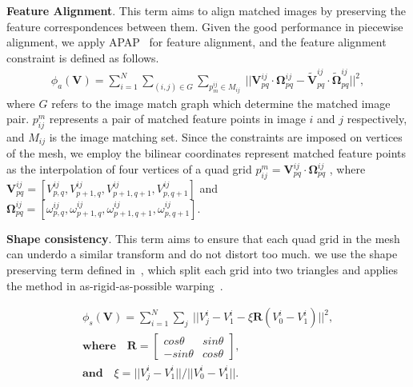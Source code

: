 \documentclass[10pt,journal,compsoc]{IEEEtran}
\begin{document}
\textbf{Feature Alignment}.
This term aims to align matched images by preserving the feature correspondences between them.
Given the good performance in piecewise alignment, we apply APAP~\cite{journals/pami/ZaragozaCTBS14} for feature alignment, and the feature alignment constraint is defined as follows.
\begin{equation} \label{equ:feature_align}
\begin{split}
    \phi_a(\mathbf{V}) = \sum\limits_{i=1}^N\sum\limits_{(i, j)\in G}\sum\limits_{p^{ij}_m \in M_{ij}} \
    ||\mathbf{V}^{ij}_{pq} \cdot  \mathbf{\Omega}^{ij}_{pq} - \mathbf{\widetilde{V}}^{ij}_{pq} \cdot  \mathbf{\widetilde{\Omega}}^{ij}_{pq}||^2,
\end{split}
\end{equation}
where $G$ refers to the image match graph which determine the matched image pair.
$p_{ij}^m$ represents a pair of matched feature points in image $i$ and $j$ respectively, and $M_{ij}$ is the image matching set.
Since the constraints are imposed on vertices of the mesh, we employ the bilinear coordinates represent matched feature points as the interpolation of four vertices of a quad grid
$p_{ij}^m=\mathbf{V}^{ij}_{pq} \cdot  \mathbf{\Omega}^{ij}_{pq}$ , where $\mathbf{V}^{ij}_{pq}=[V^{ij}_{p,q},V^{ij}_{p+1,q},V^{ij}_{p+1,q+1},V^{ij}_{p,q+1}]$ and $\mathbf{\Omega}^{ij}_{pq}=[\omega^{ij}_{p,q},\omega^{ij}_{p+1,q},\omega^{ij}_{p+1,q+1},\omega^{ij}_{p,q+1}]$.

\textbf{Shape consistency}.
This term aims to ensure that each quad grid in the mesh can underdo a similar transform and do not distort too much.
we use the shape preserving term defined in~\cite{journals/tog/LiuYT013}, which split each grid into two triangles and applies the method in as-rigid-as-possible warping~\cite{journals/tog/IgarashiMH05}.

\begin{equation} \label{equ:shape_preserving}
\begin{split}
    \phi_s(\mathbf{V}) = \sum\limits_{i=1}^N\sum\limits_{j} \
    ||V_j^i -V_1^i-\xi \mathbf{R}(V_0^i -V_1^i)||^2, \\
   \textbf{where}\quad \mathbf{R}=\left[\begin{array}{cc}cos\theta&sin\theta \\-sin\theta&cos\theta\end{array}\right], \\
    \textbf{and} \quad\xi=||V_j^i -V_1^i||/||V_0^i -V_1^i||.
\end{split}
\end{equation}
\end{document}
